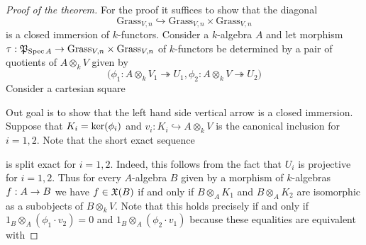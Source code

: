 \begin{proof}[Proof of the theorem]
For the proof it suffices to show that the diagonal
$$\mathrm{Grass}_{V,n}\hookrightarrow \mathrm{Grass}_{V,n}\times \mathrm{Grass}_{V,n}$$
is a closed immersion of $k$-functors. Consider a $k$-algebra $A$ and let morphism $\tau:{\mathfrak P}_{\mathrm{Spec}\, A}\rightarrow \mathrm{Grass}_{V,n} \times \mathrm{Grass}_{V,n}$ of $k$-functors be determined by a pair of quotients of $A\otimes_kV$ given by
$$\big(\phi_1:A\otimes_kV_1\twoheadrightarrow U_1,\phi_2:A\otimes_kV\twoheadrightarrow U_2\big)$$
Consider a cartesian square
\begin{center}
\end{center}
Out goal is to show that the left hand side vertical arrow is a closed immersion. Suppose that $K_i = \mathrm{ker}(\phi_i)$ and $v_i:K_i\hookrightarrow A\otimes_kV$ is the canonical inclusion for $i=1,2$. Note that the short exact sequence
\begin{center}
\end{center}
is split exact for $i=1,2$. Indeed, this follows from the fact that $U_i$ is projective for $i=1,2$. Thus for every $A$-algebra $B$ given by a morphism of $k$-algebras $f:A\rightarrow B$ we have $f\in {\mathfrak X}(B)$ if and only if $B\otimes_AK_1$ and $B\otimes_AK_2$ are isomorphic as a subobjects of $B\otimes_kV$. Note that this holds precisely if and only if $1_B\otimes_A\left(\phi_1\cdot v_2\right) = 0$ and $1_B\otimes_A\left(\phi_2\cdot v_1\right)$ because these equalities are equivalent with

\end{proof}
